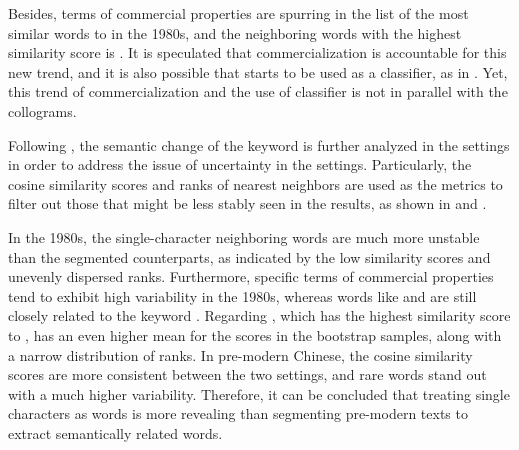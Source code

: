 Besides, terms of commercial properties are spurring in the list of the most similar words to \jia in the 1980s, and the neighboring words with the highest similarity score is . It is speculated that commercialization is accountable for this new trend, and it is also possible that \jia starts to be used as a classifier, as in . Yet, this trend of commercialization and the use of classifier is not in parallel with the collograms.

Following \textcite{antoniak2018evaluating}, the semantic change of the keyword \jia is further analyzed in the  settings in order to address the issue of uncertainty in the  settings. Particularly, the cosine similarity scores and ranks of nearest neighbors are used as the metrics to filter out those that might be less stably seen in the results, as shown in  and .

In the 1980s, the single-character neighboring words are much more unstable than the segmented counterparts, as indicated by the low similarity scores and unevenly dispersed ranks. Furthermore, specific terms of commercial properties tend to exhibit high variability in the 1980s, whereas words like  and  are still closely related to the keyword \jia\rspace. Regarding , which has the highest similarity score to \jia\rspace , has an even higher mean for the scores in the bootstrap samples, along with a narrow distribution of ranks. In pre-modern Chinese, the cosine similarity scores are more consistent between the two settings, and rare words stand out with a much higher variability. Therefore, it can be concluded that treating single characters as words is more revealing than segmenting pre-modern texts to extract semantically related words.

